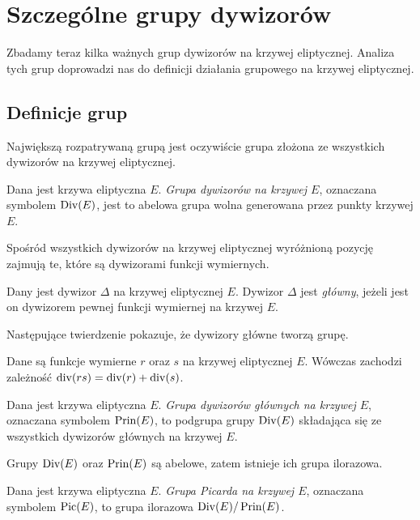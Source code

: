 \section{Szczególne grupy dywizorów}

\noindent
Zbadamy teraz kilka ważnych grup dywizorów na krzywej eliptycznej.
Analiza tych grup doprowadzi nas do definicji
działania grupowego na krzywej eliptycznej.

\subsection*{Definicje grup}

\noindent
Największą rozpatrywaną grupą jest oczywiście
grupa złożona ze wszystkich dywizorów na krzywej eliptycznej.

\begin{definition}
Dana jest krzywa eliptyczna $E$.
\emph{Grupa dywizorów na krzywej $E$},
oznaczana symbolem $\operatorname{Div}(E)$,
jest to abelowa grupa wolna generowana przez punkty krzywej $E$.
\end{definition}

\noindent
Spośród wszystkich dywizorów na krzywej eliptycznej
wyróżnioną pozycję zajmują te,
które są dywizorami funkcji wymiernych.

\begin{definition}
Dany jest dywizor $\Delta$ na krzywej eliptycznej $E$.
Dywizor $\Delta$ jest \emph{główny},
jeżeli jest on dywizorem pewnej funkcji wymiernej na krzywej $E$.
\end{definition}

\noindent
Następujące twierdzenie pokazuje, że dywizory główne tworzą grupę.

\begin{theorem}\label{fun_mul_divi_add_theorem}
Dane są funkcje wymierne $r$ oraz $s$ na krzywej eliptycznej $E$.
Wówczas zachodzi zależność $\operatorname{div}(rs) = \operatorname{div}(r) + \operatorname{div}(s)$.
\end{theorem}

\begin{definition}
Dana jest krzywa eliptyczna $E$.
\emph{Grupa dywizorów głównych na krzywej $E$},
oznaczana symbolem $\operatorname{Prin}(E)$,
to podgrupa grupy $\operatorname{Div}(E)$
składająca się ze wszystkich dywizorów głównych na krzywej $E$.
\end{definition}

\noindent
Grupy $\operatorname{Div}(E)$ oraz $\operatorname{Prin}(E)$ są abelowe,
zatem istnieje ich grupa ilorazowa.

\begin{definition}
Dana jest krzywa eliptyczna $E$.
\emph{Grupa Picarda na krzywej $E$},
oznaczana symbolem $\operatorname{Pic}(E)$,
to grupa ilorazowa $\operatorname{Div}(E)/\operatorname{Prin}(E)$.
\end{definition}

